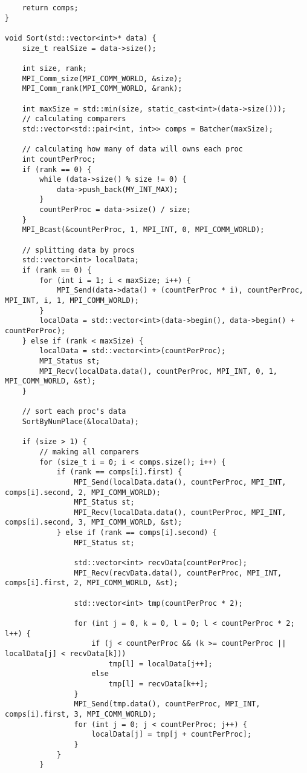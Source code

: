 \documentclass{report}
\begin{document}
\begin{lstlisting}
    return comps;
}

void Sort(std::vector<int>* data) {
    size_t realSize = data->size();

    int size, rank;
    MPI_Comm_size(MPI_COMM_WORLD, &size);
    MPI_Comm_rank(MPI_COMM_WORLD, &rank);

    int maxSize = std::min(size, static_cast<int>(data->size()));
    // calculating comparers
    std::vector<std::pair<int, int>> comps = Batcher(maxSize);

    // calculating how many of data will owns each proc
    int countPerProc;
    if (rank == 0) {
        while (data->size() % size != 0) {
            data->push_back(MY_INT_MAX);
        }
        countPerProc = data->size() / size;
    }
    MPI_Bcast(&countPerProc, 1, MPI_INT, 0, MPI_COMM_WORLD);

    // splitting data by procs
    std::vector<int> localData;
    if (rank == 0) {
        for (int i = 1; i < maxSize; i++) {
            MPI_Send(data->data() + (countPerProc * i), countPerProc, MPI_INT, i, 1, MPI_COMM_WORLD);
        }
        localData = std::vector<int>(data->begin(), data->begin() + countPerProc);
    } else if (rank < maxSize) {
        localData = std::vector<int>(countPerProc);
        MPI_Status st;
        MPI_Recv(localData.data(), countPerProc, MPI_INT, 0, 1, MPI_COMM_WORLD, &st);
    }

    // sort each proc's data
    SortByNumPlace(&localData);

    if (size > 1) {
        // making all comparers
        for (size_t i = 0; i < comps.size(); i++) {
            if (rank == comps[i].first) {
                MPI_Send(localData.data(), countPerProc, MPI_INT, comps[i].second, 2, MPI_COMM_WORLD);
                MPI_Status st;
                MPI_Recv(localData.data(), countPerProc, MPI_INT, comps[i].second, 3, MPI_COMM_WORLD, &st);
            } else if (rank == comps[i].second) {
                MPI_Status st;

                std::vector<int> recvData(countPerProc);
                MPI_Recv(recvData.data(), countPerProc, MPI_INT, comps[i].first, 2, MPI_COMM_WORLD, &st);

                std::vector<int> tmp(countPerProc * 2);

                for (int j = 0, k = 0, l = 0; l < countPerProc * 2; l++) {
                    if (j < countPerProc && (k >= countPerProc || localData[j] < recvData[k]))
                        tmp[l] = localData[j++];
                    else
                        tmp[l] = recvData[k++];
                }
                MPI_Send(tmp.data(), countPerProc, MPI_INT, comps[i].first, 3, MPI_COMM_WORLD);
                for (int j = 0; j < countPerProc; j++) {
                    localData[j] = tmp[j + countPerProc];
                }
            }
        }


\end{lstlisting}
\end{document}
